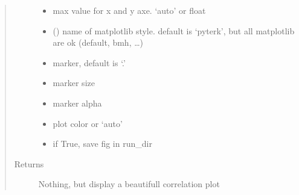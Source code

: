 \documentclass[letterpaper,10pt,english]{sphinxmanual}
\begin{document}
\begin{fulllineitems}
\begin{quote}
\begin{description}
\begin{itemize}
\item {} 
\sphinxAtStartPar
{} \textendash{} max value for x and y axe. ‘auto’ or float

\item {} 
\sphinxAtStartPar
{} () \textendash{} name of matplotlib style. default is ‘pyterk’, but all matplotlib are ok (default, bmh, …)

\item {} 
\sphinxAtStartPar
{} \textendash{} marker, default is ‘.’

\item {} 
\sphinxAtStartPar
{} \textendash{} marker size

\item {} 
\sphinxAtStartPar
{} \textendash{} marker alpha

\item {} 
\sphinxAtStartPar
{} \textendash{} plot color or ‘auto’

\item {} 
\sphinxAtStartPar
{} \textendash{} if True, save fig in run\_dir

\end{itemize}

\item[{Returns}] \leavevmode
\sphinxAtStartPar
Nothing, but display a beautifull correlation plot

\end{description}\end{quote}

\end{fulllineitems}

\end{document}
